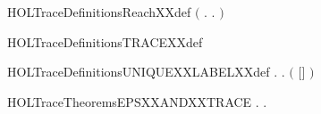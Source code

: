 \newcommand{\HOLTraceDefinitionsNODESXXdef}{\UseVerbatim{HOLTraceDefinitionsNODESXXdef}}
\begin{SaveVerbatim}{HOLTraceDefinitionsReachXXdef}
\HOLTokenTurnstile{}  \HOLSymConst{\ensuremath{=}} \ensuremath{(}\HOLTokenLambda{} . \HOLSymConst{\HOLTokenExists{}}.  \HOLTokenTransBegin{}\HOLTokenTransEnd {}\ensuremath{)}\HOLSymConst{\HOLTokenSupStar{}}
\end{SaveVerbatim}
\newcommand{\HOLTraceDefinitionsReachXXdef}{\UseVerbatim{HOLTraceDefinitionsReachXXdef}}
\begin{SaveVerbatim}{HOLTraceDefinitionsTRACEXXdef}
\HOLTokenTurnstile{}  \HOLSymConst{\ensuremath{=}}  
\end{SaveVerbatim}
\newcommand{\HOLTraceDefinitionsTRACEXXdef}{\UseVerbatim{HOLTraceDefinitionsTRACEXXdef}}
\begin{SaveVerbatim}{HOLTraceDefinitionsUNIQUEXXLABELXXdef}
\HOLTokenTurnstile{} \HOLSymConst{\HOLTokenForall{}} .
          \HOLSymConst{\HOLTokenEquiv{}}
       \HOLSymConst{\HOLTokenExists{}} . \ensuremath{(} \HOLSymConst{++} \ensuremath{[}\ensuremath{]} \HOLSymConst{++}  \HOLSymConst{\ensuremath{=}} \ensuremath{)} \HOLSymConst{\HOLTokenConj{}}   \HOLSymConst{\HOLTokenConj{}}  
\end{SaveVerbatim}
\newcommand{\HOLTraceDefinitionsUNIQUEXXLABELXXdef}{\UseVerbatim{HOLTraceDefinitionsUNIQUEXXLABELXXdef}}
\newcommand{\HOLTraceDefinitions}{
\HOLDfnTag{Trace}{finite_state_def}\HOLTraceDefinitionsfiniteXXstateXXdef
\HOLDfnTag{Trace}{LRTC_DEF}\HOLTraceDefinitionsLRTCXXDEF
\HOLDfnTag{Trace}{NO_LABEL_def}\HOLTraceDefinitionsNOXXLABELXXdef
\HOLDfnTag{Trace}{NODES_def}\HOLTraceDefinitionsNODESXXdef
\HOLDfnTag{Trace}{Reach_def}\HOLTraceDefinitionsReachXXdef
\HOLDfnTag{Trace}{TRACE_def}\HOLTraceDefinitionsTRACEXXdef
\HOLDfnTag{Trace}{UNIQUE_LABEL_def}\HOLTraceDefinitionsUNIQUEXXLABELXXdef
}
\begin{SaveVerbatim}{HOLTraceTheoremsEPSXXANDXXTRACE}
\HOLTokenTurnstile{} \HOLSymConst{\HOLTokenForall{}} .    \HOLSymConst{\HOLTokenEquiv{}} \HOLSymConst{\HOLTokenExists{}}.     \HOLSymConst{\HOLTokenConj{}}  
\end{SaveVerbatim}
